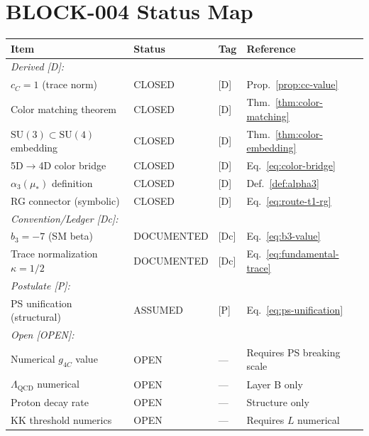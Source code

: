 \documentclass[11pt,a4paper]{article}
\theoremstyle{definition}
\begin{document}
\section{BLOCK-004 Status Map}
\label{sec:status-map}

\begin{statusbox}
\begin{center}
\begin{tabular}{llll}
\toprule
\textbf{Item} & \textbf{Status} & \textbf{Tag} & \textbf{Reference} \\
\midrule
\multicolumn{4}{l}{\textit{Derived [D]:}} \\
$c_C = 1$ (trace norm) & CLOSED & [D] & Prop.~\ref{prop:cc-value} \\
Color matching theorem & CLOSED & [D] & Thm.~\ref{thm:color-matching} \\
$\text{SU}(3) \subset \text{SU}(4)$ embedding & CLOSED & [D] & Thm.~\ref{thm:color-embedding} \\
5D$\to$4D color bridge & CLOSED & [D] & Eq.~\eqref{eq:color-bridge} \\
$\alpha_3(\mu_*)$ definition & CLOSED & [D] & Def.~\ref{def:alpha3} \\
RG connector (symbolic) & CLOSED & [D] & Eq.~\eqref{eq:route-t1-rg} \\
\midrule
\multicolumn{4}{l}{\textit{Convention/Ledger [Dc]:}} \\
$b_3 = -7$ (SM beta) & DOCUMENTED & [Dc] & Eq.~\eqref{eq:b3-value} \\
Trace normalization $\kappa = 1/2$ & DOCUMENTED & [Dc] & Eq.~\eqref{eq:fundamental-trace} \\
\midrule
\multicolumn{4}{l}{\textit{Postulate [P]:}} \\
PS unification (structural) & ASSUMED & [P] & Eq.~\eqref{eq:ps-unification} \\
\midrule
\multicolumn{4}{l}{\textit{Open [OPEN]:}} \\
Numerical $g_{4C}$ value & OPEN & — & Requires PS breaking scale \\
$\Lambda_{\text{QCD}}$ numerical & OPEN & — & Layer B only \\
Proton decay rate & OPEN & — & Structure only \\
KK threshold numerics & OPEN & — & Requires $L$ numerical \\
\bottomrule
\end{tabular}
\end{center}
\end{statusbox}
\end{document}
